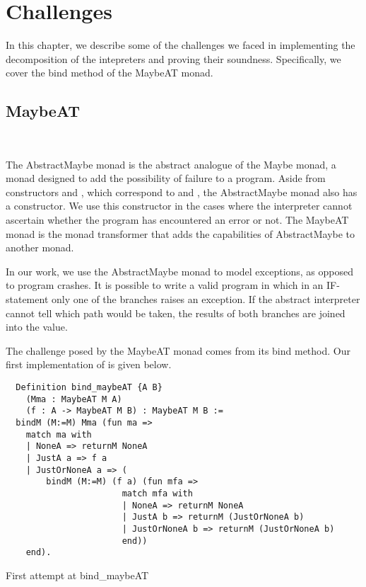 \chapter{Challenges}

In this chapter, we describe some of the challenges we faced in implementing
the decomposition of the intepreters and proving their soundness. Specifically,
we cover the bind method of the MaybeAT monad.

\section{MaybeAT}~\label{sec:challenges-maybeat}

The AbstractMaybe monad is the abstract analogue of the Maybe monad, a monad
designed to add the possibility of failure to a program. Aside from
constructors  and , which correspond to  and
, the AbstractMaybe monad also has a  constructor.
We use this constructor in the cases where the interpreter cannot ascertain
whether the program has encountered an error or not. The MaybeAT monad is the
monad transformer that adds the capabilities of AbstractMaybe to another monad.

In our work, we use the AbstractMaybe monad to model exceptions, as opposed to
program crashes. It is possible to write a valid program in which in an
IF-statement only one of the branches raises an exception. If the abstract
interpreter cannot tell which path would be taken, the results of both branches
are joined into the  value.

The challenge posed by the MaybeAT monad comes from its bind method. Our
first implementation of  is given below.

\begin{listing}[H]
\begin{verbatim}
  Definition bind_maybeAT {A B} 
    (Mma : MaybeAT M A)
    (f : A -> MaybeAT M B) : MaybeAT M B :=
  bindM (M:=M) Mma (fun ma =>
    match ma with
    | NoneA => returnM NoneA
    | JustA a => f a
    | JustOrNoneA a => (
        bindM (M:=M) (f a) (fun mfa =>
                       match mfa with
                       | NoneA => returnM NoneA
                       | JustA b => returnM (JustOrNoneA b)
                       | JustOrNoneA b => returnM (JustOrNoneA b)
                       end))
    end).
\end{verbatim}
\caption{First attempt at bind\_maybeAT}
\label{lst:bind_maybeAT}
\end{listing}

